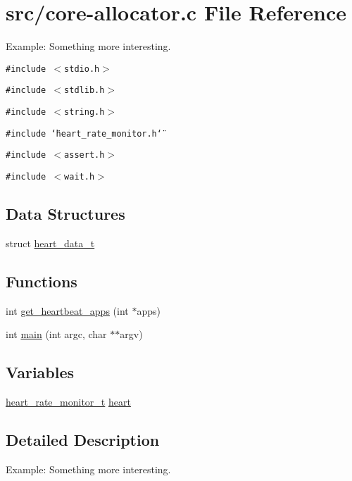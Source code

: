 \hypertarget{core-allocator_8c}{
\section{src/core-allocator.c File Reference}
\label{core-allocator_8c}
}
Example: Something more interesting. 

{\tt \#include $<$stdio.h$>$}\par
{\tt \#include $<$stdlib.h$>$}\par
{\tt \#include $<$string.h$>$}\par
{\tt \#include \char`\"{}heart\_\-rate\_\-monitor.h\char`\"{}}\par
{\tt \#include $<$assert.h$>$}\par
{\tt \#include $<$wait.h$>$}\par
\subsection*{Data Structures}
\begin{CompactItemize}
\item 
struct \hyperlink{structheart__data__t}{heart\_\-data\_\-t}
\end{CompactItemize}
\subsection*{Functions}
\begin{CompactItemize}
\item 
int \hyperlink{core-allocator_8c_718ec6ec56d322c1c0c70fdc0e4bde73}{get\_\-heartbeat\_\-apps} (int $\ast$apps)
\item 
int \hyperlink{core-allocator_8c_3c04138a5bfe5d72780bb7e82a18e627}{main} (int argc, char $\ast$$\ast$argv)
\end{CompactItemize}
\subsection*{Variables}
\begin{CompactItemize}
\item 
\hyperlink{structheart__rate__monitor__t}{heart\_\-rate\_\-monitor\_\-t} \hyperlink{core-allocator_8c_a1fede1eea37f768f78bb80a10eb860b}{heart}
\end{CompactItemize}


\subsection{Detailed Description}
Example: Something more interesting. 

